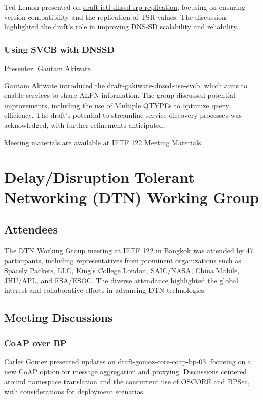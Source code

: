 \documentclass{article}
\begin{document}
Ted Lemon presented on \href{https://datatracker.ietf.org/doc/html/draft-ietf-dnssd-srp-replication}{draft-ietf-dnssd-srp-replication}, focusing on ensuring version compatibility and the replication of TSR values. The discussion highlighted the draft's role in improving DNS-SD scalability and reliability.

\subsubsection{Using SVCB with DNSSD}
Presenter: Gautam Akiwate

Gautam Akiwate introduced the \href{https://datatracker.ietf.org/doc/html/draft-gakiwate-dnssd-use-svcb}{draft-gakiwate-dnssd-use-svcb}, which aims to enable services to share ALPN information. The group discussed potential improvements, including the use of Multiple QTYPEs to optimize query efficiency. The draft's potential to streamline service discovery processes was acknowledged, with further refinements anticipated.

Meeting materials are available at \href{https://datatracker.ietf.org/meeting/122/materials}{IETF 122 Meeting Materials}.



\newpage

\section{Delay/Disruption Tolerant Networking (DTN) Working Group}

\subsection{Attendees}
The DTN Working Group meeting at IETF 122 in Bangkok was attended by 47 participants, including representatives from prominent organizations such as Spacely Packets, LLC, King's College London, SAIC/NASA, China Mobile, JHU/APL, and ESA/ESOC. The diverse attendance highlighted the global interest and collaborative efforts in advancing DTN technologies.

\subsection{Meeting Discussions}

\subsubsection{CoAP over BP}
Carles Gomez presented updates on \href{https://datatracker.ietf.org/doc/html/draft-gomez-core-coap-bp-03}{draft-gomez-core-coap-bp-03}, focusing on a new CoAP option for message aggregation and proxying. Discussions centered around namespace translation and the concurrent use of OSCORE and BPSec, with considerations for deployment scenarios.
\end{document}
